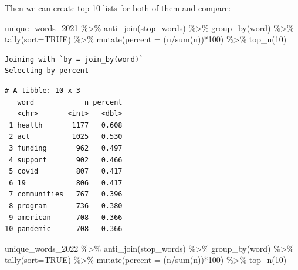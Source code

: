 \documentclass[
  letterpaper,
  DIV=11,
  numbers=noendperiod]{scrreprt}
\newenvironment{Shaded}{\begin{snugshade}}{\end{snugshade}}
\newcommand{\AttributeTok}[1]{\textcolor[rgb]{0.40,0.45,0.13}{#1}}
\newcommand{\ConstantTok}[1]{\textcolor[rgb]{0.56,0.35,0.01}{#1}}
\newcommand{\DecValTok}[1]{\textcolor[rgb]{0.68,0.00,0.00}{#1}}
\newcommand{\FunctionTok}[1]{\textcolor[rgb]{0.28,0.35,0.67}{#1}}
\newcommand{\NormalTok}[1]{\textcolor[rgb]{0.00,0.23,0.31}{#1}}
\newcommand{\SpecialCharTok}[1]{\textcolor[rgb]{0.37,0.37,0.37}{#1}}
\begin{document}
Then we can create top 10 lists for both of them and compare:

\begin{Shaded}
\begin{Highlighting}[]
\NormalTok{unique\_words\_2021 }\SpecialCharTok{\%\textgreater{}\%}
  \FunctionTok{anti\_join}\NormalTok{(stop\_words) }\SpecialCharTok{\%\textgreater{}\%}
  \FunctionTok{group\_by}\NormalTok{(word) }\SpecialCharTok{\%\textgreater{}\%}
  \FunctionTok{tally}\NormalTok{(}\AttributeTok{sort=}\ConstantTok{TRUE}\NormalTok{) }\SpecialCharTok{\%\textgreater{}\%}
  \FunctionTok{mutate}\NormalTok{(}\AttributeTok{percent =}\NormalTok{ (n}\SpecialCharTok{/}\FunctionTok{sum}\NormalTok{(n))}\SpecialCharTok{*}\DecValTok{100}\NormalTok{) }\SpecialCharTok{\%\textgreater{}\%}
  \FunctionTok{top\_n}\NormalTok{(}\DecValTok{10}\NormalTok{)}
\end{Highlighting}
\end{Shaded}

\begin{verbatim}
Joining with `by = join_by(word)`
Selecting by percent
\end{verbatim}

\begin{verbatim}
# A tibble: 10 x 3
   word            n percent
   <chr>       <int>   <dbl>
 1 health       1177   0.608
 2 act          1025   0.530
 3 funding       962   0.497
 4 support       902   0.466
 5 covid         807   0.417
 6 19            806   0.417
 7 communities   767   0.396
 8 program       736   0.380
 9 american      708   0.366
10 pandemic      708   0.366
\end{verbatim}

\begin{Shaded}
\begin{Highlighting}[]
\NormalTok{unique\_words\_2022 }\SpecialCharTok{\%\textgreater{}\%}
  \FunctionTok{anti\_join}\NormalTok{(stop\_words) }\SpecialCharTok{\%\textgreater{}\%}
  \FunctionTok{group\_by}\NormalTok{(word) }\SpecialCharTok{\%\textgreater{}\%}
  \FunctionTok{tally}\NormalTok{(}\AttributeTok{sort=}\ConstantTok{TRUE}\NormalTok{) }\SpecialCharTok{\%\textgreater{}\%}
  \FunctionTok{mutate}\NormalTok{(}\AttributeTok{percent =}\NormalTok{ (n}\SpecialCharTok{/}\FunctionTok{sum}\NormalTok{(n))}\SpecialCharTok{*}\DecValTok{100}\NormalTok{) }\SpecialCharTok{\%\textgreater{}\%}
  \FunctionTok{top\_n}\NormalTok{(}\DecValTok{10}\NormalTok{)}
\end{Highlighting}
\end{Shaded}
\end{document}
